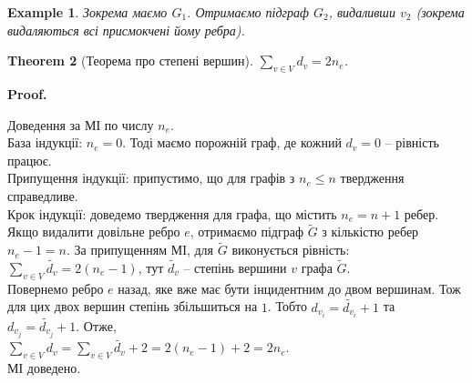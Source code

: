 \documentclass[a4paper, 14pt]{extarticle}
\makeatletter
\theoremstyle{theoremdd}
\newtheorem{theorem}{Theorem}[subsection]
\theoremstyle{theoremdd}
\theoremstyle{theoremdd}
\theoremstyle{theoremdd}
\theoremstyle{theoremdd}
\newtheorem{example}[theorem]{Example}
\theoremstyle{theoremdd}
\theoremstyle{theoremdd}
\theoremstyle{theoremdd}
\theoremstyle{theoremdd}
\theoremstyle{theoremdd}
\theoremstyle{theoremdd}
\theoremstyle{theoremdd}
\theoremstyle{theoremdd}
\theoremstyle{theoremdd}
\theoremstyle{theoremdd}
\renewenvironment{proof}[1][Proof.\\]{\par
\pushQED{\hfill \qed}%
\normalfont \topsep6\p@\@plus6\p@\relax
\trivlist
\item\relax
{\bfseries
#1\@addpunct{.}}\hspace\labelsep\ignorespaces
}{%
\popQED\endtrivlist\@endpefalse
}
\makeatother
\begin{document}
\begin{example}
Зокрема маємо $G_1$. Отримаємо підграф $G_2$, видаливши $v_2$ (зокрема видаляються всі присмокчені йому ребра).
\begin{figure}[H]
\centering
{}
\qquad
{}
\end{figure}
\end{example}

\begin{theorem}[Теорема про степені вершин]
$\displaystyle\sum_{v \in V} d_v = 2n_e$.
\end{theorem}

\begin{proof}
Доведення за МІ по числу $n_e$.\\
База індукції: $n_e = 0$. Тоді маємо порожній граф, де кожний $d_v = 0$ -- рівність працює.\\
Припущення індукції: припустимо, що для графів з $n_e \leq n$ твердження справедливе.\\
Крок індукції: доведемо твердження для графа, що містить $n_e = n+1$ ребер. Якщо видалити довільне ребро $e$, отримаємо підграф $\tilde{G}$ з кількістю ребер $n_e-1=n$. За припущенням МІ, для $\tilde{G}$ виконується рівність:\\
$\displaystyle\sum_{v \in V} \tilde{d_v} = 2(n_e-1)$, тут $\tilde{d_v}$ -- степінь вершини $v$ графа $\tilde{G}$.\\
Повернемо ребро $e$ назад, яке вже має бути інцидентним до двом вершинам. Тож для цих двох вершин степінь збільшиться на $1$. Тобто $d_{v_i} = \tilde{d_{v_i}} + 1$ та $d_{v_j} = \tilde{d_{v_j}} + 1$. Отже,\\
$\displaystyle\sum_{v \in V} d_v = \sum_{v \in V} \tilde{d_v} + 2 = 2(n_e-1) + 2 = 2n_e$.\\
МІ доведено.
\end{proof}
\end{document}
